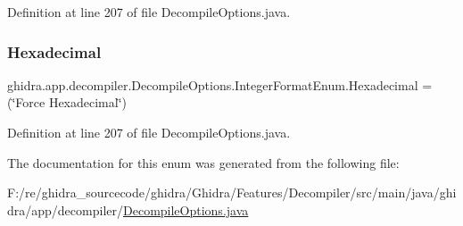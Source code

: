Definition at line 207 of file Decompile\+Options.\+java.

\mbox{\label{enumghidra_1_1app_1_1decompiler_1_1_decompile_options_1_1_integer_format_enum_ad17d2bed58a349ff04a127f3bfb78f33}} 
\subsubsection{\texorpdfstring{Hexadecimal}{Hexadecimal}}
{\footnotesize\ttfamily ghidra.\+app.\+decompiler.\+Decompile\+Options.\+Integer\+Format\+Enum.\+Hexadecimal =(\char`\"{}Force Hexadecimal\char`\"{})}



Definition at line 207 of file Decompile\+Options.\+java.



The documentation for this enum was generated from the following file\+:\begin{DoxyCompactItemize}
\item 
F\+:/re/ghidra\+\_\+sourcecode/ghidra/\+Ghidra/\+Features/\+Decompiler/src/main/java/ghidra/app/decompiler/\mbox{\hyperlink{_decompile_options_8java}{Decompile\+Options.\+java}}\end{DoxyCompactItemize}
